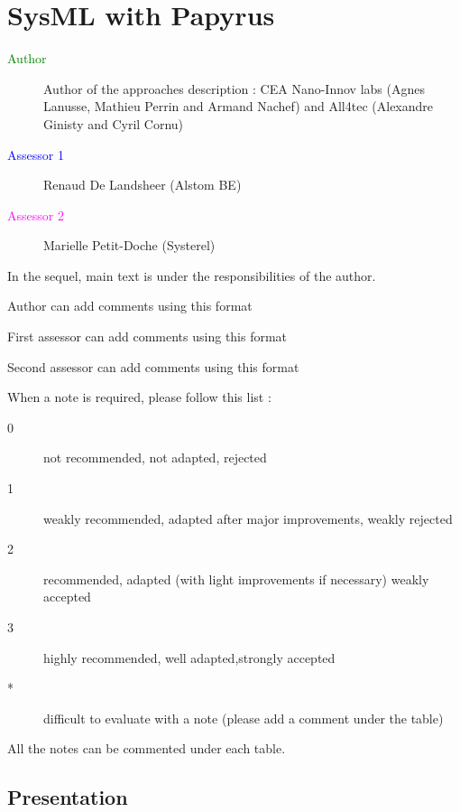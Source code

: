 \chapter{SysML with Papyrus}

\begin{description}
\item[\textcolor{green}{Author}] Author of the approaches description : CEA Nano-Innov labs (Agnes Lanusse, Mathieu Perrin and Armand Nachef) and All4tec (Alexandre Ginisty and Cyril Cornu)
\item[\textcolor{blue}{Assessor 1}] Renaud De Landsheer (Alstom BE)
\item[\textcolor{magenta}{Assessor 2}] Marielle Petit-Doche (Systerel)
\end{description}

In the sequel, main text is under the responsibilities of the author.

\begin{author_comment}
Author can add comments using this format
\end{author_comment}

\begin{assessor1}
First assessor can add comments using this format
\end{assessor1}

\begin{assessor2}
Second assessor can add comments using this format
\end{assessor2}

When a note is required, please follow this list :
\begin{description}
\item[0] not recommended, not adapted, rejected
\item[1] weakly recommended, adapted after major improvements, weakly rejected
\item[2] recommended, adapted (with light improvements if necessary) weakly accepted
\item[3] highly recommended, well adapted,strongly accepted
\item[*] difficult to evaluate with a note (please add a comment under the table)
\end{description}

All the notes can be commented under each table.

\section{Presentation}

